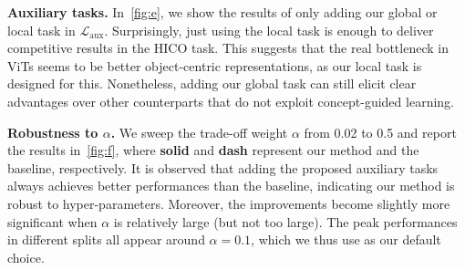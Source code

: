 \documentclass{article} \usepackage{iclr2022_conference,times}
\renewcommand{\paragraph}[1]{\noindent\textbf{#1.}}
\newcommand{\loss}{\mathcal{L}}
\begin{document}
\paragraph{Auxiliary tasks}
In~\autoref{fig:e}, we show the results of only adding our global or local task in $\loss_{\operatorname{aux}}$. Surprisingly, just using the local task is enough to deliver competitive results in the HICO task. This suggests that the real bottleneck in ViTs seems to be better object-centric representations, as our local task is designed for this. Nonetheless, adding our global task can still elicit clear advantages over other counterparts that do not exploit concept-guided learning.

\paragraph{Robustness to $\alpha$}
We sweep the trade-off weight $\alpha$ from 0.02 to 0.5 and report the results in~\autoref{fig:f}, where \textbf{solid} and \textbf{dash} represent our method and the baseline, respectively. It is observed that adding the proposed auxiliary tasks always achieves better performances than the baseline, indicating our method is robust to hyper-parameters.  Moreover, the improvements become slightly more significant when $\alpha$ is relatively large (but not too large). The peak performances in different splits all appear around $\alpha=0.1$, which we thus use as our default choice. 
\end{document}
